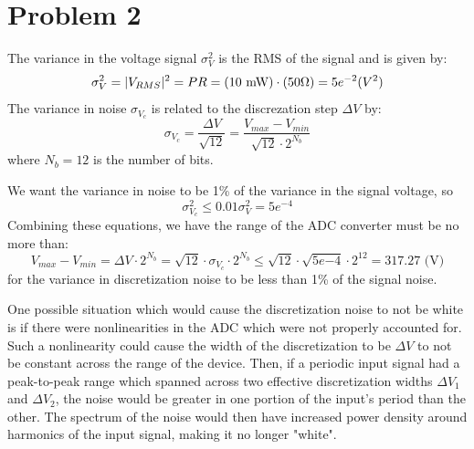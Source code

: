 \documentclass{homework}
\begin{document}
\section{Problem 2}
\begin{letterenum}
\item The variance in the voltage signal $\sigma_V^2$ is the RMS of the signal
and is given by:
\begin{equation*}
    \sigma_V^2 = |V_{RMS}|^2 = P R = (10 \text{ mW}) \cdot (50 \ohm) = 5e^{-2} \text( V^2)
\end{equation*}
The variance in noise $\sigma_{V_c}$ is related to the discrezation step $\Delta V$
by:
\begin{equation*}
    \sigma_{V_c} = \frac{\Delta V}{\sqrt{12}} = \frac{V_{max} - V_{min}}{\sqrt{12} \cdot 2^{N_b}}
\end{equation*}
where $N_b = 12$ is the number of bits.

We want the variance in noise to be 1\% of the variance in the signal voltage, so
\begin{equation*}
    \sigma_{V_c}^2 \leq 0.01 \sigma_V^2 = 5e^{-4}
\end{equation*}
Combining these equations, we have the range of the ADC converter must be no more than:
\begin{equation*}
    V_{max} - V_{min} = \Delta V \cdot 2^{N_b} = \sqrt{12} \cdot \sigma_{V_c} \cdot 2^{N_b}
        \leq \sqrt{12} \cdot \sqrt{5e{-4}} \cdot 2^{12} = 317.27 \text{ (V)}
\end{equation*}
for the variance in discretization noise to be less than 1\% of the signal noise.

\item One possible situation which would cause the discretization noise to not be
white is if there were nonlinearities in the ADC which were not properly accounted for.
Such a nonlinearity could cause the width of the discretization to be $\Delta V$ to
not be constant across the range of the device. Then, if a periodic input signal
had a peak-to-peak range which spanned across two effective discretization widths 
$\Delta V_1$ and $\Delta V_2$, the noise would be greater in one portion of the
input's period than the other. The spectrum of the noise would then have increased
power density around harmonics of the input signal, making it no longer "white".
    
\end{letterenum}
\end{document}

